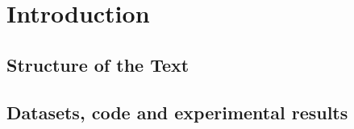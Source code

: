\chapter{Introduction}\label{ch:introduction}


\section{Structure of the Text}

\section{Datasets, code and experimental results}













\cleardoublepage


